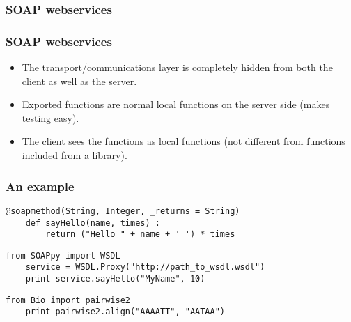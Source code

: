 \begin{frame}
  \frametitle{SOAP webservices}

  \vspace{-0.5cm}
  \begin{center}
    \resizebox{11cm}{6.5cm}{
      
    }
  \end{center}
\end{frame}

\begin{frame}
  \frametitle{SOAP webservices}
  \bigskip

  \begin{itemize}
    \item The transport/communications layer is completely hidden from both the
          client as well as the server.
    \bigskip
    \item Exported functions are normal local functions on the server side
      (makes testing easy).
    \bigskip
    \item The client sees the functions as local functions (not different from
          functions included from a library).
  \end{itemize}
\end{frame}

\begin{frame}[fragile]
  \frametitle{An example}

  \begin{lstlisting}[caption = {Server side}]
    @soapmethod(String, Integer, _returns = String)
    def sayHello(name, times) :
        return ("Hello " + name + ' ') * times
  \end{lstlisting}

  \begin{lstlisting}[caption = {Client side}]
    from SOAPpy import WSDL
    service = WSDL.Proxy("http://path_to_wsdl.wsdl")
    print service.sayHello("MyName", 10)
  \end{lstlisting}
  \bigskip
  \pause

  \begin{lstlisting}[caption = {Local function (for comparison)}]
    from Bio import pairwise2
    print pairwise2.align("AAAATT", "AATAA")
  \end{lstlisting}
\end{frame}

